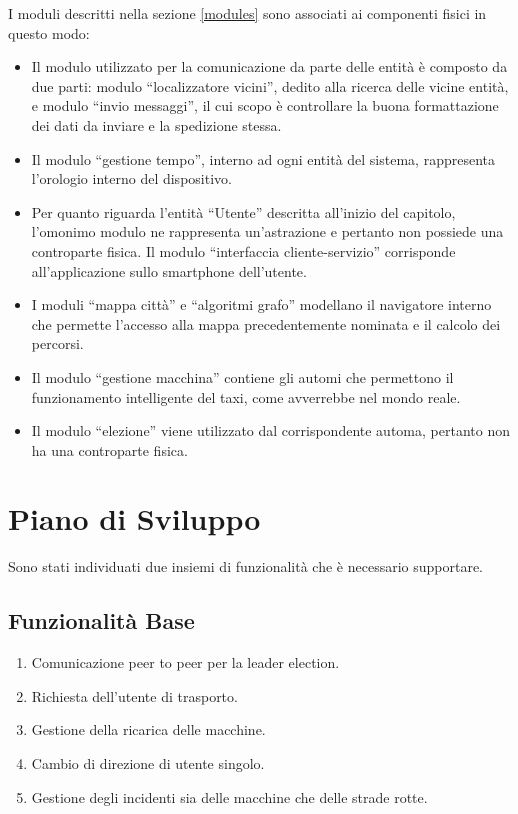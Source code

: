 I moduli descritti nella sezione \ref{modules} sono associati ai componenti fisici in questo modo:
\begin{itemize}
	\item Il modulo utilizzato per la comunicazione da parte delle entità è composto da due parti: modulo ``localizzatore vicini'', dedito alla ricerca delle vicine entità, e modulo ``invio messaggi'', il cui scopo è controllare la buona formattazione dei dati da inviare e la spedizione stessa.
	\item Il modulo ``gestione tempo'', interno ad ogni entità del sistema, rappresenta l'orologio interno del dispositivo.
	\item Per quanto riguarda l'entità ``Utente'' descritta all'inizio del capitolo, l'omonimo modulo ne rappresenta un'astrazione e pertanto non possiede una controparte fisica. Il modulo ``interfaccia cliente-servizio'' corrisponde all'applicazione sullo smartphone dell'utente.
	\item I moduli ``mappa città'' e ``algoritmi grafo'' modellano il navigatore interno che permette l'accesso alla mappa precedentemente nominata e il calcolo dei percorsi.
	\item Il modulo ``gestione macchina'' contiene gli automi che permettono il funzionamento intelligente del taxi, come avverrebbe nel mondo reale.
	\item Il modulo ``elezione'' viene utilizzato dal corrispondente automa, pertanto non ha una controparte fisica.
\end{itemize}

\newpage

\section{Piano di Sviluppo}

Sono stati individuati due insiemi di funzionalità che è necessario supportare.
\subsection{Funzionalità Base}

\begin{enumerate}
	\item Comunicazione peer to peer per la leader election.
	\item Richiesta dell'utente di trasporto.
	\item Gestione della ricarica delle macchine.
	\item Cambio di direzione di utente singolo.
	\item Gestione degli incidenti sia delle macchine che delle strade rotte.
\end{enumerate}

